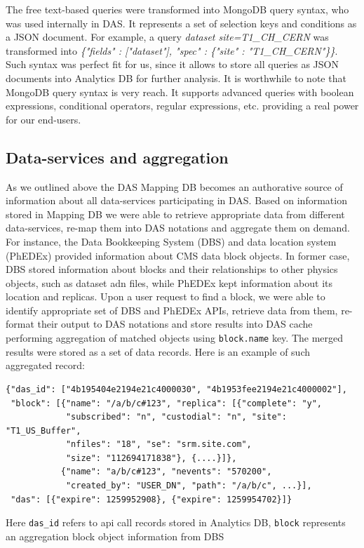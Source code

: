 \documentclass[1p,times]{elsarticle}
\begin{document}
The free text-based queries were transformed into MongoDB query syntax, 
who was used internally in DAS. It represents a set of selection 
keys and conditions as a JSON document. For example, a query
{\it dataset site=T1\_CH\_CERN}
was transformed into 
{\it \{"fields" : ["dataset"], "spec" : \{"site" : "T1\_CH\_CERN"\}\}}.
Such syntax was perfect fit for us, since it allows to store all queries
as JSON documents into Analytics DB for further analysis. It is worthwhile to note that
MongoDB query syntax is very reach. It supports advanced queries with 
boolean expressions, conditional operators, regular expressions, etc. providing
a real power for our end-users.

\subsection{Data-services and aggregation}
As we outlined above the DAS Mapping DB becomes an authorative
source of information about all data-services participating in DAS.
Based on information stored in Mapping DB we were able to 
retrieve appropriate data from different data-services, re-map them into 
DAS notations and aggregate them on demand. For instance, the Data 
Bookkeeping System (DBS) and data location system (PhEDEx)
provided information about CMS data block objects. In former case, DBS 
stored information about blocks and their relationships to other 
physics objects, such as dataset adn files, while PhEDEx kept
information about its location and replicas. Upon a user request to 
find a block, we were able to identify appropriate set of DBS and PhEDEx APIs, 
retrieve data from them, re-format their output to DAS notations 
and store results into DAS cache performing aggregation of matched 
objects using \verb+block.name+ key. The merged results were stored 
as a set of data records. Here is an example of such aggregated record:
\begin{verbatim}
{"das_id": ["4b195404e2194e21c4000030", "4b1953fee2194e21c4000002"], 
 "block": [{"name": "/a/b/c#123", "replica": [{"complete": "y", 
            "subscribed": "n", "custodial": "n", "site": "T1_US_Buffer", 
            "nfiles": "18", "se": "srm.site.com", 
            "size": "112694171838"}, {....}]},
           {"name": "a/b/c#123", "nevents": "570200", 
            "created_by": "USER_DN", "path": "/a/b/c", ...}],
 "das": [{"expire": 1259952908}, {"expire": 1259954702}]}
\end{verbatim}
Here \verb+das_id+ refers to api call records stored in Analytics DB,
\verb+block+ represents an aggregation block object information from DBS
\end{document}
